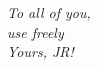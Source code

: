 \thispagestyle{empty}
\begin{center}
\vspace*{40mm}

\Large{\emph{To all of you,\\
use freely}}\\

\vspace*{30mm} \Large{\emph{Yours, JR!}}\\


\end{center}

\pagebreak
